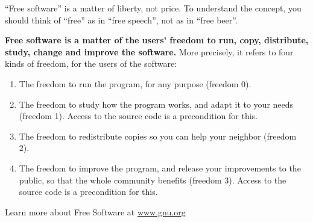 \newpage
\begin{english}

“Free software” is a matter of liberty, not price. To understand the concept, you should think of “free” as in “free speech”, not as in “free beer”.

\textbf{Free software is a matter of the users' freedom to run, copy, distribute, study, change and improve the software.} More precisely, it refers to four kinds of freedom, for the users of the software:
\begin{enumerate}
 \itemsep0em
 \item The freedom to run the program, for any purpose (freedom 0).
 \item The freedom to study how the program works, and adapt it to your needs (freedom 1). Access to the source code is a precondition for this.
 \item The freedom to redistribute copies so you can help your neighbor (freedom 2).
 \item The freedom to improve the program, and release your improvements to the public, so that the whole community benefits (freedom 3). Access to the source code is a precondition for this.
\end{enumerate}

Learn more about Free Software at \url{www.gnu.org}
\end{english}
